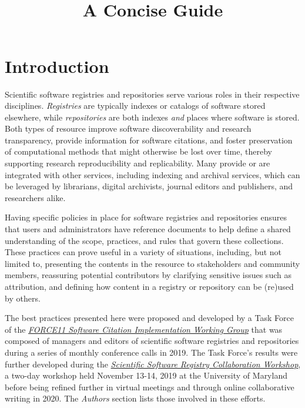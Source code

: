 \documentclass[11pt]{article}
\title{\textls[-27]{Nine Best Practices for Research Software Registries and Repositories:}\\
A Concise Guide}
\author{}
\begin{document}
\maketitle
\tableofcontents

\newcommand{\sectionbreak}{\clearpage}


\section{Introduction}
\label{introduction}

Scientific software registries and repositories serve various roles in their respective disciplines. \emph{Registries} are typically indexes or catalogs of software stored elsewhere, while \emph{repositories} are both indexes \emph{and} places where software is stored. Both types of resource improve software discoverability and research transparency, provide information for software citations, and foster preservation of computational methods that might otherwise be lost over time, thereby supporting research reproducibility and replicability. Many provide or are integrated with other services, including indexing and archival services, which can be leveraged by librarians, digital archivists, journal editors and publishers, and researchers alike.

Having specific policies in place for software registries and repositories ensures that users and administrators have reference documents to help define a shared understanding of the scope, practices, and rules that govern these collections. These practices can prove useful in a variety of situations, including, but not limited to, presenting the contents in the resource to stakeholders and community members, reassuring potential contributors by clarifying sensitive issues such as attribution, and defining how content in a registry or repository can be (re)used by others.

The best practices presented here were proposed and developed by a Task Force of the \href{https://github.com/force11/force11-sciwg}{\emph{FORCE11 Software Citation Implementation Working Group}} that was composed of managers and editors of scientific software registries and repositories during a series of monthly conference calls in 2019. The Task Force's results were further developed during the \href{https://asclnet.github.io/SWRegistryWorkshop/}{\emph{Scientific Software Registry Collaboration Workshop}}, a two-day workshop held November 13-14, 2019 at the University of Maryland before being refined further in virtual meetings and through online collaborative writing in 2020. The \emph{Authors} section lists those involved in these efforts.
\end{document}
